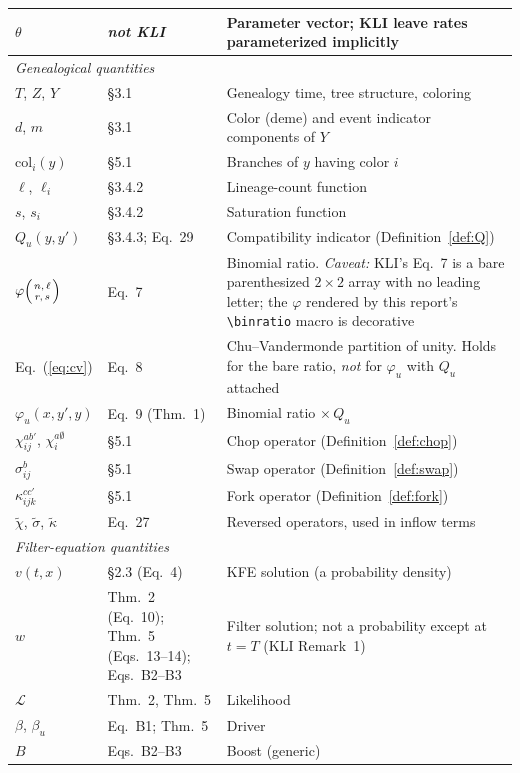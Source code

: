 \documentclass[11pt,leqno]{article}
\newcommand{\lik}{\mathcal{L}}      %
\newcommand{\binratio}[4]{\varphi\!\left(\genfrac{}{}{0pt}{}{#1,\,#2}{#3,\,#4}\right)}
\newcommand{\code}[1]{\texttt{#1}}
\theoremstyle{plain}
\theoremstyle{definition}
\begin{document}
\begin{longtable}{@{}p{}p{}p{}@{}}
$\theta$ & \emph{not KLI} & Parameter vector; KLI leave rates
  parameterized implicitly \\
\midrule
\multicolumn{3}{l}{\textit{Genealogical quantities}}\\
$T$, $Z$, $Y$ & \S3.1 & Genealogy time, tree structure, coloring \\
$d$, $m$ & \S3.1 & Color (deme) and event indicator components of $Y$ \\
$\mathrm{col}_i(y)$ & \S5.1 & Branches of $y$ having color $i$ \\
$\ell$, $\ell_i$ & \S3.4.2 & Lineage-count function \\
$s$, $s_i$ & \S3.4.2 & Saturation function \\
$Q_u(y,y')$ & \S3.4.3; Eq.~29 & Compatibility indicator
  (Definition~\ref{def:Q}) \\
$\binratio{n}{\ell}{r}{s}$ & Eq.~7 & Binomial ratio.  \emph{Caveat:}
  KLI's Eq.~7 is a bare parenthesized $2 \times 2$ array with no
  leading letter; the $\varphi$ rendered by this report's
  \code{\textbackslash binratio} macro is decorative \\
Eq.~(\ref{eq:cv}) & Eq.~8 & Chu--Vandermonde partition of unity.  Holds
  for the bare ratio, \emph{not} for $\varphi_u$ with $Q_u$ attached \\
$\varphi_u(x,y',y)$ & Eq.~9 (Thm.~1) & Binomial ratio $\times\, Q_u$ \\
$\chi^{ab'}_{ij}$, $\chi^{a\emptyset}_i$ & \S5.1 & Chop operator
  (Definition~\ref{def:chop}) \\
$\sigma^{b}_{ij}$ & \S5.1 & Swap operator (Definition~\ref{def:swap}) \\
$\kappa^{cc'}_{ijk}$ & \S5.1 & Fork operator (Definition~\ref{def:fork}) \\
$\tilde{\chi}$, $\tilde{\sigma}$, $\tilde{\kappa}$ & Eq.~27 & Reversed
  operators, used in inflow terms \\
\midrule
\multicolumn{3}{l}{\textit{Filter-equation quantities}}\\
$v(t,x)$ & \S2.3 (Eq.~4) & KFE solution (a probability density) \\
$w$ & Thm.~2 (Eq.~10); Thm.~5 (Eqs.~13--14); Eqs.~B2--B3 & Filter
  solution; not a probability except at $t = T$ (KLI Remark~1) \\
$\lik$ & Thm.~2, Thm.~5 & Likelihood \\
$\beta$, $\beta_u$ & Eq.~B1; Thm.~5 & Driver \\
$B$ & Eqs.~B2--B3 & Boost (generic) \\

\end{longtable}
\end{document}
